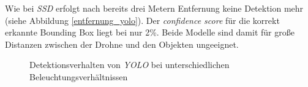 Wie bei \textit{SSD} erfolgt nach bereits drei Metern Entfernung keine Detektion mehr (siehe Abbildung \ref{entfernung_yolo}). Der \textit{confidence score} für die korrekt erkannte Bounding Box liegt bei nur 2\%. Beide Modelle sind damit für große Distanzen zwischen der Drohne und den Objekten ungeeignet.
 
\begin{figure}[H]
 	\hfill
 	\hfill
 	\hfill
 	\caption{Detektionsverhalten von \textit{YOLO} bei unterschiedlichen Beleuchtungsverhältnissen}
 	\label{sicht_yolo}
\end{figure}
